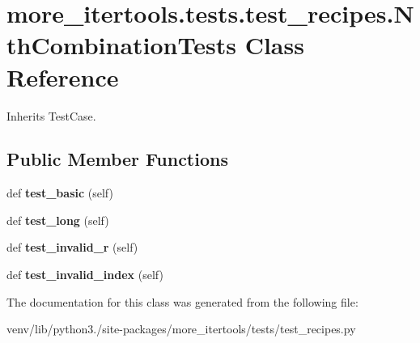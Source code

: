 \hypertarget{classmore__itertools_1_1tests_1_1test__recipes_1_1_nth_combination_tests}{}\section{more\+\_\+itertools.\+tests.\+test\+\_\+recipes.\+Nth\+Combination\+Tests Class Reference}
\label{classmore__itertools_1_1tests_1_1test__recipes_1_1_nth_combination_tests}


Inherits Test\+Case.

\subsection*{Public Member Functions}
\begin{DoxyCompactItemize}
\item 
\mbox{\label{classmore__itertools_1_1tests_1_1test__recipes_1_1_nth_combination_tests_a15974f2bfc5e796304556e9a94b1685a}} 
def {\bfseries test\+\_\+basic} (self)
\item 
\mbox{\label{classmore__itertools_1_1tests_1_1test__recipes_1_1_nth_combination_tests_a537cb4329e0736d31cfb55310d4e1245}} 
def {\bfseries test\+\_\+long} (self)
\item 
\mbox{\label{classmore__itertools_1_1tests_1_1test__recipes_1_1_nth_combination_tests_a71bc750b32b253fb0a854b72b3acffea}} 
def {\bfseries test\+\_\+invalid\+\_\+r} (self)
\item 
\mbox{\label{classmore__itertools_1_1tests_1_1test__recipes_1_1_nth_combination_tests_afe7e0f8dc13679f776f0236bf1f7c1be}} 
def {\bfseries test\+\_\+invalid\+\_\+index} (self)
\end{DoxyCompactItemize}


The documentation for this class was generated from the following file\+:\begin{DoxyCompactItemize}
\item 
venv/lib/python3./site-\/packages/more\+\_\+itertools/tests/test\+\_\+recipes.\+py\end{DoxyCompactItemize}
